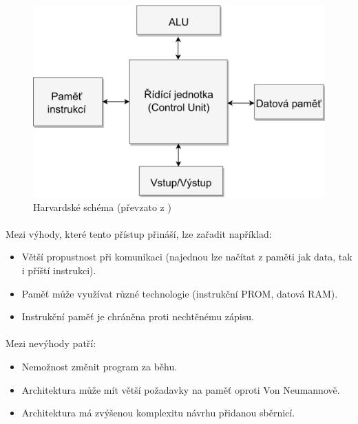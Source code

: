 \documentclass[FM,BP]{tulthesis}
\begin{document}
\begin{figure}[h]
    \includegraphics[scale=1]{assets/Harvard_Architecture.png}
    \centering
    \caption{Harvardské schéma (převzato z \cite{Schema_pc})}
    \label{img:Harvard}
\end{figure}

\paragraph{}
Mezi výhody, které tento přístup přináší, lze zařadit například:
\begin{itemize}
    \item Větší propustnost při komunikaci (najednou lze načítat z paměti jak data, tak i příští instrukci).
    \item Paměť může využívat různé technologie (instrukční PROM, datová RAM).
    \item Instrukční paměť je chráněna proti nechtěnému zápisu. 
\end{itemize}

\paragraph{}
Mezi nevýhody patří:
\begin{itemize}
    \item Nemožnost změnit program za běhu.
    \item Architektura může mít větší požadavky na paměť oproti Von Neumannově. 
    \item Architektura má zvýšenou komplexitu návrhu přidanou sběrnicí. \cite{gfg_harvard}
\end{itemize}
\end{document}
